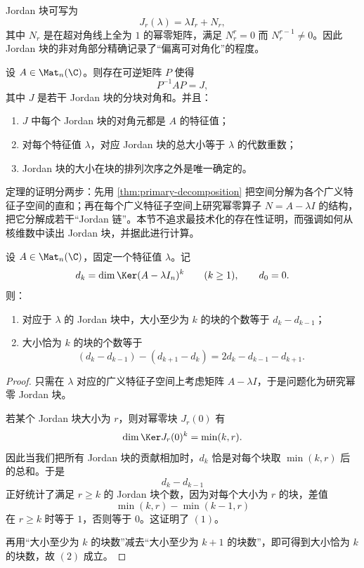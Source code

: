 Jordan 块可写为
\[
J_r(\lambda)=\lambda I_r+N_r,
\]
其中 \(N_r\) 是在超对角线上全为 \(1\) 的幂零矩阵，满足 \(N_r^r=0\) 而 \(N_r^{r-1}\neq 0\)。因此 Jordan 块的非对角部分精确记录了“偏离可对角化”的程度。

\begin{theorem}
设 \(A\in \Mat_n(\C)\)。则存在可逆矩阵 \(P\) 使得
\[
P^{-1}AP=J,
\]
其中 \(J\) 是若干 Jordan 块的分块对角和。并且：
\begin{enumerate}[label=(\arabic*), leftmargin=2.4em]
  \item \(J\) 中每个 Jordan 块的对角元都是 \(A\) 的特征值；
  \item 对每个特征值 \(\lambda\)，对应 Jordan 块的总大小等于 \(\lambda\) 的代数重数；
  \item Jordan 块的大小在块的排列次序之外是唯一确定的。
\end{enumerate}
\end{theorem}

\begin{remark}
定理的证明分两步：先用 \cref{thm:primary-decomposition} 把空间分解为各个广义特征子空间的直和；再在每个广义特征子空间上研究幂零算子 \(N=A-\lambda I\) 的结构，把它分解成若干“Jordan 链”。本节不追求最技术化的存在性证明，而强调如何从核维数中读出 Jordan 块，并据此进行计算。
\end{remark}

\begin{proposition}\label{prop:jordan-kernel-count}
设 \(A\in \Mat_n(\C)\)，固定一个特征值 \(\lambda\)。记
\[
d_k=\dim \Ker(A-\lambda I_n)^k\qquad (k\ge 1),\qquad d_0=0.
\]
则：
\begin{enumerate}[label=(\arabic*), leftmargin=2.4em]
  \item 对应于 \(\lambda\) 的 Jordan 块中，大小至少为 \(k\) 的块的个数等于 \(d_k-d_{k-1}\)；
  \item 大小恰为 \(k\) 的块的个数等于
  \[
  (d_k-d_{k-1})-(d_{k+1}-d_k)=2d_k-d_{k-1}-d_{k+1}.
  \]
\end{enumerate}
\end{proposition}

\begin{proof}
只需在 \(\lambda\) 对应的广义特征子空间上考虑矩阵 \(A-\lambda I\)，于是问题化为研究幂零 Jordan 块。

若某个 Jordan 块大小为 \(r\)，则对幂零块 \(J_r(0)\) 有
\[
\dim\Ker J_r(0)^k=\min(k,r).
\]
因此当我们把所有 Jordan 块的贡献相加时，\(d_k\) 恰是对每个块取 \(\min(k,r)\) 后的总和。于是
\[
d_k-d_{k-1}
\]
正好统计了满足 \(r\ge k\) 的 Jordan 块个数，因为对每个大小为 \(r\) 的块，差值
\[
\min(k,r)-\min(k-1,r)
\]
在 \(r\ge k\) 时等于 \(1\)，否则等于 \(0\)。这证明了 \((1)\)。

再用“大小至少为 \(k\) 的块数”减去“大小至少为 \(k+1\) 的块数”，即可得到大小恰为 \(k\) 的块数，故 \((2)\) 成立。
\end{proof}

